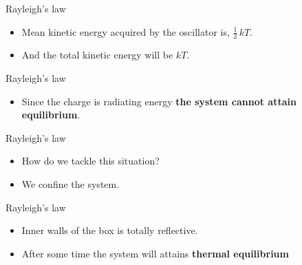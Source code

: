 \documentclass[aspectratio=169]{beamer}
\newcommand{\highlight}[1]{\textbf{#1}}
\begin{document}
\begin{frame}{Rayleigh's law}
	
	\begin{itemize}
	
		\item Mean kinetic energy acquired by the oscillator is, $\frac{1}{2}\,kT$. \newline
		\item And the total kinetic energy will be $ kT $. 
		
	\end{itemize}
		
\end{frame}

\begin{frame}{Rayleigh's law}

	\begin{itemize}

		\item Since the charge is radiating energy \highlight{the system cannot attain equilibrium}.
			
	\end{itemize}
	
\end{frame}

	
\begin{frame}{Rayleigh's law}

	\begin{itemize}
			
		\item How do we tackle this situation? \pause \newline
		\item We confine the system.
		
	\end{itemize}
	
\end{frame}
	
		
\begin{frame}{Rayleigh's law}

	\begin{itemize}
			
		\item Inner walls of the box is totally reflective.\newline
		\item After some time the system will attains \highlight{thermal equilibrium}
	\end{itemize}
	
\end{frame}
		
\end{document}
